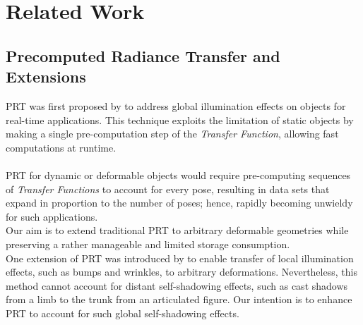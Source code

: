 \section{Related Work}
\subsection*{Precomputed Radiance Transfer and Extensions} 
PRT was first proposed by \cite{sloan2002precomputed} to address global illumination effects on objects for real-time applications. This technique exploits the limitation of static objects by making a single pre-computation step of the \textit{Transfer Function}, allowing fast computations at runtime. \\
\\
PRT for dynamic or deformable objects would require pre-computing sequences of \textit{Transfer Functions} to account for every pose, resulting in data sets that expand in proportion to the number of poses; hence, rapidly becoming unwieldy for such applications.\\
Our aim is to extend traditional PRT to arbitrary deformable geometries while preserving a rather manageable and limited storage consumption. \\
One extension of PRT was introduced by  \cite{local-deformable-precomputed-radiance-transfer} to enable transfer of local illumination effects, such as bumps and wrinkles, to arbitrary deformations.  Nevertheless, this method cannot account for distant self-shadowing effects, such as cast shadows from a limb to the trunk from an articulated figure. Our intention is to enhance PRT to account for such global self-shadowing effects.\\
